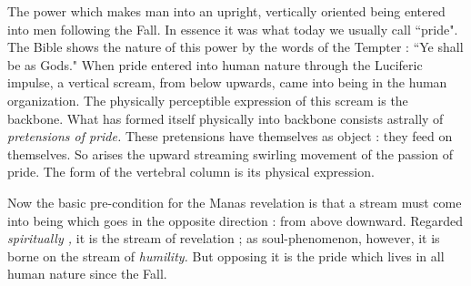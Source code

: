 \begin{quotationx}
The power which makes man into an upright, vertically oriented being entered into men following the Fall. In essence it was what today we usually call ``pride". The Bible shows the nature of this power by the words of the Tempter : ``Ye shall be as Gods." When pride entered into human nature through the Luciferic impulse, a vertical scream, from below upwards, came into being in the human organization. The physically perceptible expression of this scream is the backbone. What has formed itself physically into backbone consists astrally of \emph{pretensions of pride.} These pretensions have themselves as object : they feed on themselves. So arises the upward streaming swirling movement of the passion of pride. The form of the vertebral column is its physical expression.

Now the basic pre-condition for the Manas revelation is that a stream must come into being which goes in the opposite direction : from above downward. Regarded \emph{spiritually ,} it is the stream of revelation ; as soul-phenomenon, however, it is borne on the stream of \emph{humility.} But opposing it is the pride which lives in all human nature since the Fall.


\end{quotationx}
